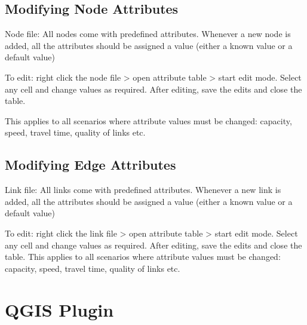 \documentclass[
]{book}
\begin{document}
\hypertarget{modifying-node-attributes}{%
\chapter{Modifying Node Attributes}\label{modifying-node-attributes}}

Node file: All nodes come with predefined attributes. Whenever a new node is added, all the attributes should be assigned a value (either a known value or a default value)

To edit: right click the node file \textgreater{} open attribute table \textgreater{} start edit mode. Select any cell and change values as required. After editing, save the edits and close the table.

This applies to all scenarios where attribute values must be changed: capacity, speed, travel time, quality of links etc.

\hypertarget{modifying-edge-attributes}{%
\chapter{Modifying Edge Attributes}\label{modifying-edge-attributes}}

Link file: All links come with predefined attributes. Whenever a new link is added, all the attributes should be assigned a value (either a known value or a default value)

To edit: right click the link file \textgreater{} open attribute table \textgreater{} start edit mode. Select any cell and change values as required. After editing, save the edits and close the table.
This applies to all scenarios where attribute values must be changed: capacity, speed, travel time, quality of links etc.

\hypertarget{part-qgis-plugin}{%
\part{QGIS Plugin}\label{part-qgis-plugin}}
\end{document}
